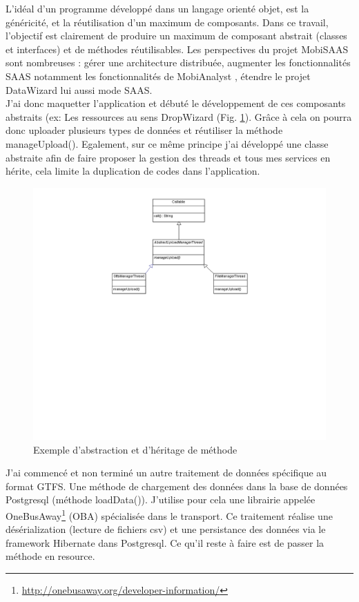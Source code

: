 \begin{itemize}
L'idéal d'un programme développé dans un langage orienté objet, est la généricité, et la réutilisation d'un maximum de composants. Dans ce travail, l'objectif est clairement de produire un maximum de composant abstrait (classes et interfaces) et de méthodes réutilisables. Les perspectives du projet \og MobiSAAS \fg sont nombreuses : gérer une architecture distribuée, augmenter les fonctionnalités SAAS notamment les fonctionnalités de \og MobiAnalyst \fg, étendre le projet \og DataWizard \fg lui aussi mode SAAS.\\

J'ai donc \og maquetter l'application \fg et débuté le développement de ces composants abstraits (ex: Les ressources au sens DropWizard (Fig. \ref{UML1}). Grâce à cela on pourra donc \og uploader \fg plusieurs types de données et réutiliser la méthode manageUpload(). Egalement, sur ce même principe j'ai développé une classe abstraite afin de faire proposer la gestion des threads et tous mes services en hérite, cela limite la duplication de codes dans l'application.\\
\begin{figure}[!h]
\centering
\includegraphics[width=14cm]{images/DiagrammeThread.png}
\caption{\label{UML1}Exemple d'abstraction et d'héritage de méthode}
\end{figure} 

J'ai commencé et non terminé un autre traitement de données spécifique au format GTFS. Une méthode de chargement des données dans la base de données Postgresql (méthode loadData()). J'utilise pour cela une librairie appelée OneBusAway\footnote{\url{http://onebusaway.org/developer-information/}} (OBA) spécialisée dans le transport. Ce traitement réalise une désérialization (lecture de fichiers csv) et une persistance des données via le framework Hibernate dans Postgresql. Ce qu'il reste à faire est de passer la méthode en resource.






\end{itemize}
